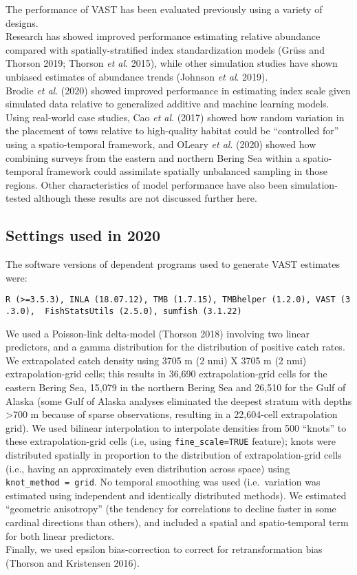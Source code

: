 \documentclass[
  11pt,
]{article}
\begin{document}
The performance of VAST has been evaluated previously using a variety of designs.\\
Research has showed improved performance estimating relative abundance compared with spatially-stratified index standardization models (Grüss and Thorson 2019; Thorson \emph{et al}. 2015), while other simulation studies have shown unbiased estimates of abundance trends (Johnson \emph{et al}. 2019).\\
Brodie \emph{et al}. (2020) showed improved performance in estimating index scale given simulated data relative to generalized additive and machine learning models.\\
Using real-world case studies, Cao \emph{et al}. (2017) showed how random variation in the placement of tows relative to high-quality habitat could be ``controlled for'' using a spatio-temporal framework, and OLeary \emph{et al}. (2020) showed how combining surveys from the eastern and northern Bering Sea within a spatio-temporal framework could assimilate spatially unbalanced sampling in those regions. Other characteristics of model performance have also been simulation-tested although these results are not discussed further here.

\hypertarget{settings-used-in-2020}{%
\subsection{Settings used in 2020}\label{settings-used-in-2020}}

The software versions of dependent programs used to generate VAST estimates were:

\texttt{R\ (\textgreater{}=3.5.3),\ INLA\ (18.07.12),\ TMB\ (1.7.15),\ TMBhelper\ (1.2.0),\ VAST\ (3.3.0),\ \ FishStatsUtils\ (2.5.0),\ sumfish\ (3.1.22)}

We used a Poisson-link delta-model (Thorson 2018) involving two linear predictors, and a gamma distribution for the distribution of positive catch rates.
We extrapolated catch density using 3705 m (2 nmi) X 3705 m (2 nmi) extrapolation-grid cells; this results in 36,690 extrapolation-grid cells for the eastern Bering Sea, 15,079 in the northern Bering Sea and 26,510 for the Gulf of Alaska (some Gulf of Alaska analyses eliminated the deepest stratum with depths \textgreater700 m because of sparse observations, resulting in a 22,604-cell extrapolation grid).
We used bilinear interpolation to interpolate densities from 500 ``knots'' to these extrapolation-grid cells (i.e, using \texttt{fine\_scale=TRUE} feature); knots were distributed spatially in proportion to the distribution of extrapolation-grid cells (i.e., having an approximately even distribution across space) using \texttt{knot\_method\ =\ \textquotesingle{}grid\textquotesingle{}}.
No temporal smoothing was used (i.e.~variation was estimated using independent and identically distributed methods).
We estimated ``geometric anisotropy'' (the tendency for correlations to decline faster in some cardinal directions than others), and included a spatial and spatio-temporal term for both linear predictors.\\
Finally, we used epsilon bias-correction to correct for retransformation bias (Thorson and Kristensen 2016).
\end{document}
